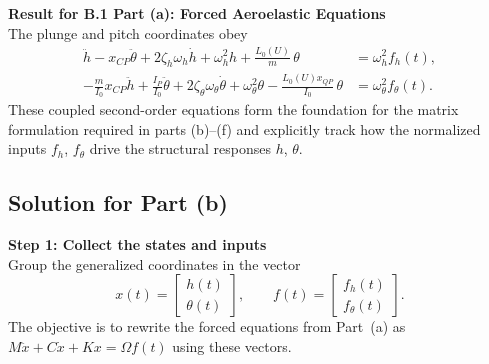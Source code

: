 \documentclass[12pt]{article}
\begin{document}
\begin{resultsbox}
\textbf{Result for B.1 Part (a): Forced Aeroelastic Equations}\\[0.5em]
The plunge and pitch coordinates obey
\[
\begin{aligned}
 \ddot{h} - x_{CP}\ddot{\theta} + 2\zeta_h\omega_h \dot{h} + \omega_h^2 h + \frac{L_0(U)}{m}\,\theta &= \omega_h^2 f_h(t),\\
 -\frac{m}{I_0}x_{CP}\ddot{h} + \frac{I_P}{I_0}\ddot{\theta} + 2\zeta_\theta \omega_\theta \dot{\theta} + \omega_\theta^2 \theta - \frac{L_0(U)x_{QP}}{I_0}\,\theta &= \omega_\theta^2 f_\theta(t).
\end{aligned}
\]
These coupled second-order equations form the foundation for the matrix formulation required in parts (b)--(f) and explicitly track how the normalized inputs $f_h$, $f_\theta$ drive the structural responses $h$, $\theta$.
\end{resultsbox}

\subsection*{Solution for Part (b)}

\begin{stepbox}
\textbf{Step 1: Collect the states and inputs}\\[0.5em]
Group the generalized coordinates in the vector
\[
  x(t) = \begin{bmatrix} h(t) \\ \theta(t) \end{bmatrix},
\qquad
  f(t) = \begin{bmatrix} f_h(t) \\ f_\theta(t) \end{bmatrix}.
\]
The objective is to rewrite the forced equations from Part~(a) as $M\ddot{x} + C\dot{x} + Kx = \Omega f(t)$ using these vectors.
\end{stepbox}
\end{document}
